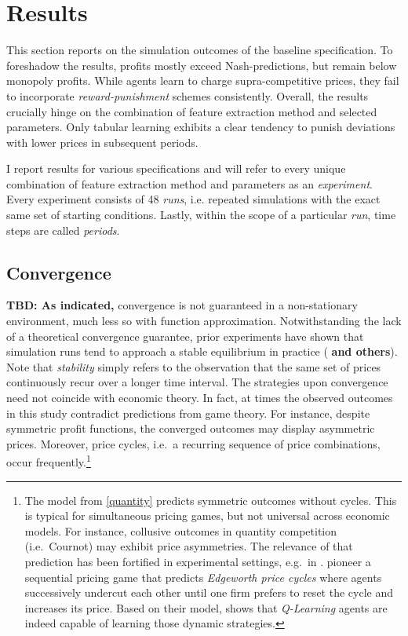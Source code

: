 
\section{Results}
This section reports on the simulation outcomes of the baseline specification. To foreshadow the results, profits mostly exceed Nash-predictions, but remain below monopoly profits. While agents learn to charge supra-competitive prices, they fail to incorporate \emph{reward-punishment} schemes consistently. Overall, the results crucially hinge on the combination of feature extraction method and selected parameters. Only tabular learning exhibits a clear tendency to punish deviations with lower prices in subsequent periods.

I report results for various specifications and will refer to every unique combination of feature extraction method and parameters as an \emph{experiment}. Every experiment consists of 48 \emph{runs}, i.e. repeated simulations with the exact same set of starting conditions. Lastly, within the scope of a particular \emph{run}, time steps are called \emph{periods}.

\subsection{Convergence}\label{convergence}

\textbf{TBD: As indicated,} convergence is not guaranteed in a non-stationary environment, much less so with function approximation. Notwithstanding the lack of a theoretical convergence guarantee, prior experiments have shown that simulation runs tend to approach a stable equilibrium in practice (\cite{calvano_artificial_2019} \textbf{and others}). Note that \emph{stability} simply refers to the observation that the same set of prices continuously recur over a longer time interval. The strategies upon convergence need not coincide with economic theory. In fact, at times the observed outcomes in this study contradict predictions from game theory. For instance, despite symmetric profit functions, the converged outcomes may display asymmetric prices. Moreover, price cycles, i.e.\ a recurring sequence of price combinations, occur frequently.\footnote{The model from \autoref{quantity} predicts symmetric outcomes without cycles. This is typical for simultaneous pricing games, but not universal across economic models. For instance, collusive outcomes in quantity competition (i.e.\ Cournot) may exhibit price asymmetries. The relevance of that prediction has been fortified in experimental settings, e.g.\ in \textcite{fischer_collusion_2019}. \textcite{maskine-tirole} pioneer a sequential pricing game that predicts \emph{Edgeworth price cycles} where agents successively undercut each other until one firm prefers to reset the cycle and increases its price. Based on their model, \textcite{klein_autonomous_2019} shows that \emph{Q-Learning} agents are indeed capable of learning those dynamic strategies.}



